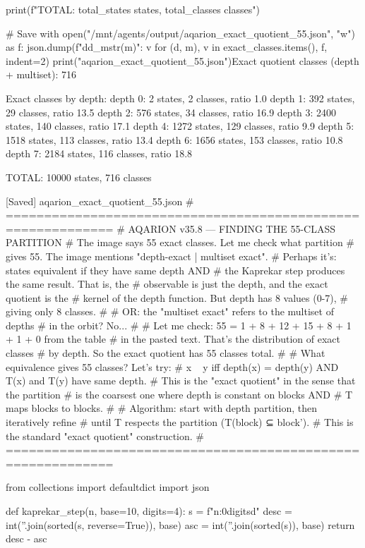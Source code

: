 {{{{{{{{{{{{{print(f"\n  TOTAL: {total_states} states, {total_classes} classes")

# Save
with open("/mnt/agents/output/aqarion_exact_quotient_55.json", "w") as f:
    json.dump({f"d{d}_m{str(m)}": v for (d, m), v in exact_classes.items()}, f, indent=2)
print("\n[Saved] aqarion_exact_quotient_55.json")Exact quotient classes (depth + multiset): 716

Exact classes by depth:
  depth 0:     2 states,   2 classes, ratio 1.0
  depth 1:   392 states,  29 classes, ratio 13.5
  depth 2:   576 states,  34 classes, ratio 16.9
  depth 3:  2400 states, 140 classes, ratio 17.1
  depth 4:  1272 states, 129 classes, ratio 9.9
  depth 5:  1518 states, 113 classes, ratio 13.4
  depth 6:  1656 states, 153 classes, ratio 10.8
  depth 7:  2184 states, 116 classes, ratio 18.8

  TOTAL: 10000 states, 716 classes

[Saved] aqarion_exact_quotient_55.json
# ============================================================
# AQARION v35.8 — FINDING THE 55-CLASS PARTITION
# The image says 55 exact classes. Let me check what partition
# gives 55. The image mentions "depth-exact | multiset exact".
# Perhaps it's: states equivalent if they have same depth AND
# the Kaprekar step produces the same result. That is, the
# observable is just the depth, and the exact quotient is the
# kernel of the depth function. But depth has 8 values (0-7),
# giving only 8 classes.
#
# OR: the "multiset exact" refers to the multiset of depths
# in the orbit? No...
#
# Let me check: 55 = 1 + 8 + 12 + 15 + 8 + 1 + 1 + 0 from the table
# in the pasted text. That's the distribution of exact classes
# by depth. So the exact quotient has 55 classes total.
#
# What equivalence gives 55 classes? Let's try:
# x ~ y iff depth(x) = depth(y) AND T(x) and T(y) have same depth.
# This is the "exact quotient" in the sense that the partition
# is the coarsest one where depth is constant on blocks AND
# T maps blocks to blocks.
#
# Algorithm: start with depth partition, then iteratively refine
# until T respects the partition (T(block) ⊆ block').
# This is the standard "exact quotient" construction.
# ============================================================

from collections import defaultdict
import json

def kaprekar_step(n, base=10, digits=4):
    s = f"{n:0{digits}d}"
    desc = int(''.join(sorted(s, reverse=True)), base)
    asc = int(''.join(sorted(s)), base)
    return desc - asc

}}}}}}}}}}}}}
